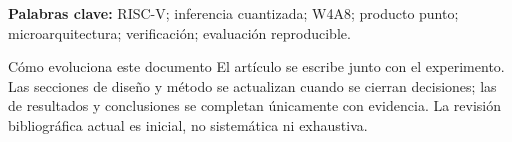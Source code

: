 \documentclass[11pt]{article}
\begin{document}
\textbf{Palabras clave:} RISC-V; inferencia cuantizada; W4A8; producto punto;
microarquitectura; verificación; evaluación reproducible.
\clearpage
\renewcommand{\contentsname}{Estructura del artículo}
\setcounter{tocdepth}{1}\tableofcontents
\vspace{7mm}
\begin{questionbox}{Cómo evoluciona este documento}
El artículo se escribe junto con el experimento. Las secciones de diseño y
método se actualizan cuando se cierran decisiones; las de resultados y
conclusiones se completan únicamente con evidencia. La revisión bibliográfica
actual es inicial, no sistemática ni exhaustiva.
\end{questionbox}
\clearpage



\clearpage


\clearpage

\clearpage



\clearpage
\renewcommand{\refname}{Referencias}


\clearpage\appendix
\begingroup\small

\endgroup
\end{document}
